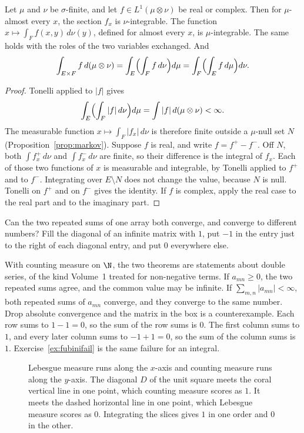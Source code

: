 \begin{theorem}[Fubini]\label{thm:fubini}
Let $\mu$ and $\nu$ be $\sigma$-finite, and let $f\in L^1(\mu\otimes\nu)$ be real or complex. Then for $\mu$-almost every $x$, the section $f_x$ is $\nu$-integrable. The function $x\mapsto\int_F f(x,y)\,d\nu(y)$, defined for almost every $x$, is $\mu$-integrable. The same holds with the roles of the two variables exchanged. And
\[\int_{E\times F}f\,d(\mu\otimes\nu)=\int_E\Bigl(\int_Ff\,d\nu\Bigr)d\mu=\int_F\Bigl(\int_Ef\,d\mu\Bigr)d\nu.\]
\end{theorem}
\begin{proof}
Tonelli applied to $|f|$ gives
\[
\int_E\Bigl(\int_F|f|\,d\nu\Bigr)d\mu=\int|f|\,d(\mu\otimes\nu)<\infty.
\]
The measurable function $x\mapsto\int_F|f_x|\,d\nu$ is therefore finite outside a $\mu$-null set $N$ (Proposition~\ref{prop:markov}). Suppose $f$ is real, and write $f=f^+-f^-$. Off $N$, both $\int f^+_x\,d\nu$ and $\int f^-_x\,d\nu$ are finite, so their difference is the integral of $f_x$. Each of those two functions of $x$ is measurable and integrable, by Tonelli applied to $f^+$ and to $f^-$. Integrating over $E\setminus N$ does not change the value, because $N$ is null. Tonelli on $f^+$ and on $f^-$ gives the identity. If $f$ is complex, apply the real case to the real part and to the imaginary part.
\end{proof}

\begin{think}
Can the two repeated sums of one array both converge, and converge to different numbers? Fill the diagonal of an infinite matrix with $1$, put $-1$ in the entry just to the right of each diagonal entry, and put $0$ everywhere else.
\end{think}

With counting measure on $\N$, the two theorems are statements about double series, of the kind Volume~1 treated for non-negative terms. If $a_{mn}\ge 0$, the two repeated sums agree, and the common value may be infinite. If $\sum_{m,n}|a_{mn}|<\infty$, both repeated sums of $a_{mn}$ converge, and they converge to the same number. Drop absolute convergence and the matrix in the box is a counterexample. Each row sums to $1-1=0$, so the sum of the row sums is $0$. The first column sums to $1$, and every later column sums to $-1+1=0$, so the sum of the column sums is $1$. Exercise~\ref{ex:fubinifail} is the same failure for an integral.

\begin{figure}[ht]
\centering
{}
\caption{Lebesgue measure runs along the $x$-axis and counting measure runs along the $y$-axis. The diagonal $D$ of the unit square meets the coral vertical line in one point, which counting measure scores as $1$. It meets the dashed horizontal line in one point, which Lebesgue measure scores as $0$. Integrating the slices gives $1$ in one order and $0$ in the other.}
\label{fig:diagcount}
\end{figure}

